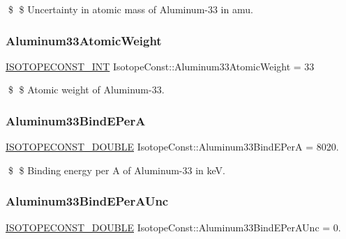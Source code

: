 \$ \$ Uncertainty in atomic mass of Aluminum-\/33 in amu. \mbox{\label{group___isotope_const-_aluminum-_al33_gaf8645e991fad81edea49b4ae1f45f3d7}} 
\subsubsection{\texorpdfstring{Aluminum33\+Atomic\+Weight}{Aluminum33AtomicWeight}}
{\footnotesize\ttfamily \mbox{\hyperlink{group___isotope_const-_macros_ga5f18360b3e99483a35c32d789e62621c}{I\+S\+O\+T\+O\+P\+E\+C\+O\+N\+S\+T\+\_\+\+I\+NT}} Isotope\+Const\+::\+Aluminum33\+Atomic\+Weight = 33}

\$ \$ Atomic weight of Aluminum-\/33. \mbox{\label{group___isotope_const-_aluminum-_al33_ga617c8bb79fea5b18e46e5f31e94b6824}} 
\subsubsection{\texorpdfstring{Aluminum33\+Bind\+E\+PerA}{Aluminum33BindEPerA}}
{\footnotesize\ttfamily \mbox{\hyperlink{group___isotope_const-_macros_ga8f45a7272ce02c0b4c65c44636ed719a}{I\+S\+O\+T\+O\+P\+E\+C\+O\+N\+S\+T\+\_\+\+D\+O\+U\+B\+LE}} Isotope\+Const\+::\+Aluminum33\+Bind\+E\+PerA = 8020.}

\$ \$ Binding energy per A of Aluminum-\/33 in keV. \mbox{\label{group___isotope_const-_aluminum-_al33_ga01b55fd06668b374e7ffaf655a579972}} 
\subsubsection{\texorpdfstring{Aluminum33\+Bind\+E\+Per\+A\+Unc}{Aluminum33BindEPerAUnc}}
{\footnotesize\ttfamily \mbox{\hyperlink{group___isotope_const-_macros_ga8f45a7272ce02c0b4c65c44636ed719a}{I\+S\+O\+T\+O\+P\+E\+C\+O\+N\+S\+T\+\_\+\+D\+O\+U\+B\+LE}} Isotope\+Const\+::\+Aluminum33\+Bind\+E\+Per\+A\+Unc = 0.}

